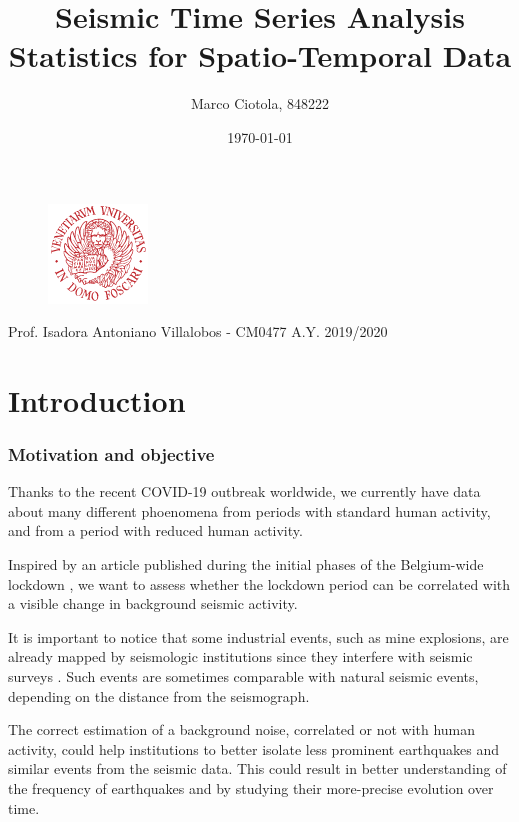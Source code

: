 \documentclass[12pt]{article}
\title{Seismic Time Series Analysis\\Statistics for Spatio-Temporal Data}
\author{Marco Ciotola, 848222}
\date{\today}
\begin{document}
\maketitle
\begin{figure}[t!]
	\begin{center}
		\includegraphics[width=100px]{ca_foscari_logo.png}
	\end{center}
\end{figure}
\vfill Prof. Isadora Antoniano Villalobos - CM0477
\hfill A.Y. 2019/2020
\newpage
\tableofcontents \clearpage
{}



\section{Introduction}

\subsubsection{Motivation and objective}
Thanks to the recent COVID-19 outbreak worldwide, we currently have data about many different phoenomena from periods with standard human activity, and from a period with reduced human activity.

Inspired by an article published during the initial phases of the Belgium-wide lockdown \cite{NatureCoronavirusSeismic}, we want to assess whether the lockdown period can be correlated with a visible change in background seismic activity.

It is important to notice that some industrial events, such as mine explosions, are already mapped by seismologic institutions since they interfere with seismic surveys \cite{OtherSeismicEvents}. Such events are sometimes comparable with natural seismic events, depending on the distance from the seismograph.

The correct estimation of a background noise, correlated or not with human activity, could help institutions to better isolate less prominent earthquakes and similar events from the seismic data. This could result in better understanding of the frequency of earthquakes and by studying their more-precise evolution over time.
\end{document}
